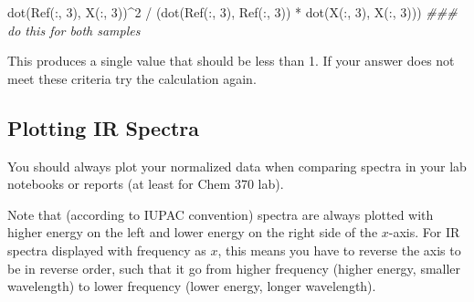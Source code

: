 \documentclass[]{tufte-book}
\newenvironment{Shaded}{}{}
\newcommand{\CommentTok}[1]{\textcolor[rgb]{0.38,0.63,0.69}{\textit{#1}}}
\newcommand{\FloatTok}[1]{\textcolor[rgb]{0.25,0.63,0.44}{#1}}
\newcommand{\FunctionTok}[1]{\textcolor[rgb]{0.02,0.16,0.49}{#1}}
\newcommand{\NormalTok}[1]{#1}
\newcommand{\OperatorTok}[1]{\textcolor[rgb]{0.40,0.40,0.40}{#1}}
\begin{document}
\begin{Shaded}
\begin{Highlighting}[]
\FunctionTok{dot}\NormalTok{(Ref(}\OperatorTok{:,} \FloatTok{3}\NormalTok{)}\OperatorTok{,}\NormalTok{ X(}\OperatorTok{:,} \FloatTok{3}\NormalTok{))}\OperatorTok{^}\FloatTok{2} \OperatorTok{/}\NormalTok{ (}\FunctionTok{dot}\NormalTok{(Ref(}\OperatorTok{:,} \FloatTok{3}\NormalTok{)}\OperatorTok{,}\NormalTok{ Ref(}\OperatorTok{:,} \FloatTok{3}\NormalTok{)) }\OperatorTok{*} \FunctionTok{dot}\NormalTok{(X(}\OperatorTok{:,} \FloatTok{3}\NormalTok{)}\OperatorTok{,}\NormalTok{ X(}\OperatorTok{:,} \FloatTok{3}\NormalTok{)))}
\CommentTok{### do this for both samples}
\end{Highlighting}
\end{Shaded}

This produces a single value that should be less than 1. If your answer does not meet these criteria try the calculation again.

\hypertarget{plotting-ir-spectra}{%
\subsection*{Plotting IR Spectra}\label{plotting-ir-spectra}}

You should always plot your normalized data when comparing spectra in your lab notebooks or reports (at least for Chem 370 lab).

Note that (according to IUPAC convention) spectra are always plotted with higher energy on the left and lower energy on the right side of the \(x\)-axis. For IR spectra displayed with frequency as \(x\), this means you have to reverse the axis to be in reverse order, such that it go from higher frequency (higher energy, smaller wavelength) to lower frequency (lower energy, longer wavelength).
\end{document}
